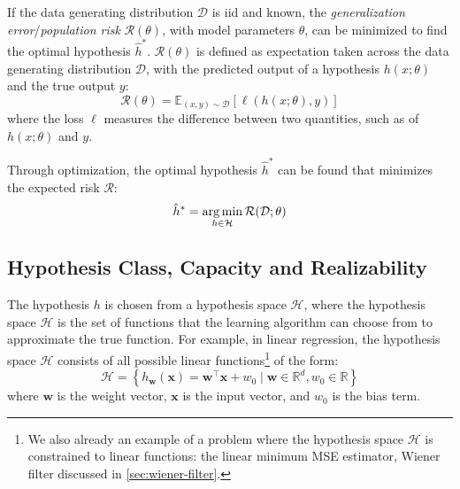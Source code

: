 If the data generating distribution $\mathcal{D}$ is \gls{iid} and known, the \textit{generalization error}/\textit{population risk} $\mathcal{R}(\theta)$, with model parameters $\theta$, can be minimized to find the optimal hypothesis $\hat{h}^*$. $\mathcal{R}(\theta)$ is defined as expectation taken across the data generating distribution $\mathcal{D}$, with the predicted output of a hypothesis $h(x; \theta)$ and the true output $y$:
\begin{equation}\label{eq:risk}
    \mathcal{R}(\theta) = \mathbb{E}_{(x, y) \sim \mathcal{D}} \left[ \ell(h(x; \theta), y) \right]
\end{equation}
where the loss $\ell$ measures the difference between two quantities, such as of $h(x; \theta)$ and $y$.

Through optimization, the optimal hypothesis $\hat{h}^*$  can be found that minimizes the expected risk $\mathcal{R}$:
\begin{equation}\label{eq:risk-min}
    \hat{h}^* = \operatorname*{arg\,min}_{h \in \mathcal{H}} \mathcal{R}(\mathcal{D}; \theta)
\end{equation}

\subsection{Hypothesis Class, Capacity and Realizability}
The hypothesis $h$ is chosen from a hypothesis space $\mathcal{H}$, where the hypothesis space $\mathcal{H}$ is the set of functions that the learning algorithm can choose from to approximate the true function. 
For example, in linear regression, the hypothesis space $\mathcal{H}$ consists of all possible  linear functions\footnote{We also already an example of a problem where the hypothesis space $\mathcal{H}$ is constrained to linear functions: the linear minimum \gls{MSE} estimator, Wiener filter discussed in \cref{sec:wiener-filter}.} of the form:
\begin{equation}\label{eq:linear-hypothesis}
   \mathcal{H} =  \left\{ h_{\mathbf{w}}(\mathbf{x}) = \mathbf{w}^\top \mathbf{x} + w_0 \mid \mathbf{w} \in \mathbb{R}^d, w_0 \in \mathbb{R} \right\}
\end{equation}
where $\mathbf{w}$ is the weight vector, $\mathbf{x}$ is the input vector, and $w_0$ is the bias term. 

